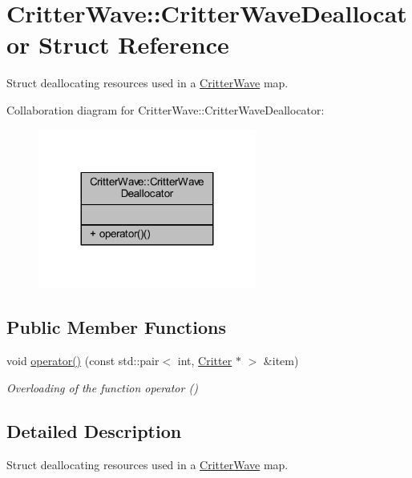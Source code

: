 \hypertarget{struct_critter_wave_1_1_critter_wave_deallocator}{\section{Critter\+Wave\+:\+:Critter\+Wave\+Deallocator Struct Reference}
\label{struct_critter_wave_1_1_critter_wave_deallocator}
}


Struct deallocating resources used in a \hyperlink{class_critter_wave}{Critter\+Wave} map.  




Collaboration diagram for Critter\+Wave\+:\+:Critter\+Wave\+Deallocator\+:\nopagebreak
\begin{figure}[H]
\begin{center}
\leavevmode
\includegraphics[width=203pt]{struct_critter_wave_1_1_critter_wave_deallocator__coll__graph}
\end{center}
\end{figure}
\subsection*{Public Member Functions}
\begin{DoxyCompactItemize}
\item 
void \hyperlink{struct_critter_wave_1_1_critter_wave_deallocator_a3b5befe161e66cd3d7cf9d72b948cd6a}{operator()} (const std\+::pair$<$ int, \hyperlink{class_critter}{Critter} $\ast$ $>$ \&item)
\begin{DoxyCompactList}\small\item\em Overloading of the function operator () \end{DoxyCompactList}\end{DoxyCompactItemize}


\subsection{Detailed Description}
Struct deallocating resources used in a \hyperlink{class_critter_wave}{Critter\+Wave} map. 

